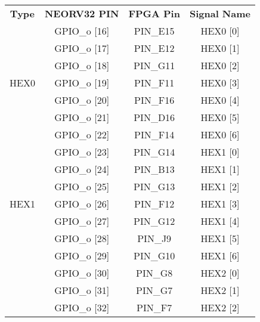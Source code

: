 \begin{table}[!htb]\scriptsize
    \centering 
    \begin{tabular}{c c c c}
        \toprule[1.5pt]
        \textbf{Type} & \quad \quad \textbf{NEORV32 PIN} & \quad \quad \textbf{FPGA Pin} & \quad \quad \textbf{Signal Name}  \\

               & \quad \quad GPIO\_o [16] & \quad \quad PIN\_E15 & \quad \quad HEX0 [0]\\
               & \quad \quad GPIO\_o [17] & \quad \quad PIN\_E12 & \quad \quad HEX0 [1]\\
               & \quad \quad GPIO\_o [18] & \quad \quad PIN\_G11 & \quad \quad HEX0 [2]\\
        HEX0   & \quad \quad GPIO\_o [19] & \quad \quad PIN\_F11 & \quad \quad HEX0 [3]\\        
               & \quad \quad GPIO\_o [20] & \quad \quad PIN\_F16 & \quad \quad HEX0 [4]\\
               & \quad \quad GPIO\_o [21] & \quad \quad PIN\_D16 & \quad \quad HEX0 [5]\\
               & \quad \quad GPIO\_o [22] & \quad \quad PIN\_F14 & \quad \quad HEX0 [6]\\
        \hline
               & \quad \quad GPIO\_o [23] & \quad \quad PIN\_G14 & \quad \quad HEX1 [0]\\
               & \quad \quad GPIO\_o [24] & \quad \quad PIN\_B13 & \quad \quad HEX1 [1]\\
               & \quad \quad GPIO\_o [25] & \quad \quad PIN\_G13 & \quad \quad HEX1 [2]\\
        HEX1   & \quad \quad GPIO\_o [26] & \quad \quad PIN\_F12 & \quad \quad HEX1 [3]\\        
               & \quad \quad GPIO\_o [27] & \quad \quad PIN\_G12 & \quad \quad HEX1 [4]\\
               & \quad \quad GPIO\_o [28] & \quad \quad PIN\_J9  & \quad \quad HEX1 [5]\\
               & \quad \quad GPIO\_o [29] & \quad \quad PIN\_G10 & \quad \quad HEX1 [6]\\    
        \hline
               & \quad \quad GPIO\_o [30] & \quad \quad PIN\_G8   & \quad \quad HEX2 [0]\\
               & \quad \quad GPIO\_o [31] & \quad \quad PIN\_G7   & \quad \quad HEX2 [1]\\
               & \quad \quad GPIO\_o [32] & \quad \quad PIN\_F7   & \quad \quad HEX2 [2]\\

\end{tabular}
\end{table}
